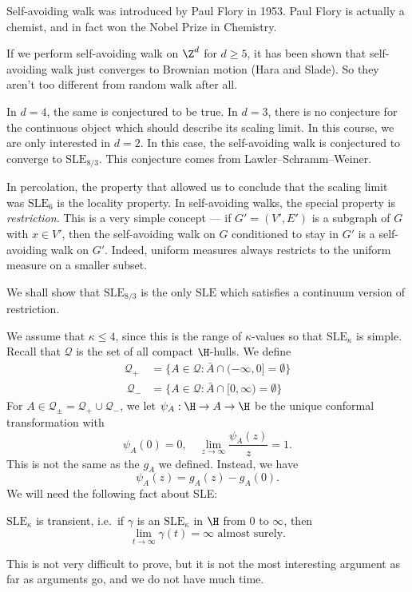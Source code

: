 \documentclass[a4paper]{article}
\newcommand\SLE{\mathrm{SLE}}
\begin{document}
Self-avoiding walk was introduced by Paul Flory in 1953. Paul Flory is actually a chemist, and in fact won the Nobel Prize in Chemistry. %

If we perform self-avoiding walk on $\Z^d$ for $d \geq 5$, it has been shown that self-avoiding walk just converges to Brownian motion (Hara and Slade). So they aren't too different from random walk after all.

In $d = 4$, the same is conjectured to be true. In $d = 3$, there is no conjecture for the continuous object which should describe its scaling limit. In this course, we are only interested in $d = 2$. In this case, the self-avoiding walk is conjectured to converge to $\SLE_{8/3}$. This conjecture comes from Lawler--Schramm--Weiner.

In percolation, the property that allowed us to conclude that the scaling limit was $\SLE_6$ is the locality property. In self-avoiding walks, the special property is \emph{restriction}. This is a very simple concept --- if $G' = (V', E')$ is a subgraph of $G$ with $x \in V'$, then the self-avoiding walk on $G$ conditioned to stay in $G'$ is a self-avoiding walk on $G'$. Indeed, uniform measures always restricts to the uniform measure on a smaller subset.

We shall show that $\SLE_{8/3}$ is the only $\SLE$ which satisfies a continuum version of restriction.

We assume that $\kappa \leq 4$, since this is the range of $\kappa$-values so that $\SLE_\kappa$ is simple. Recall that $\mathcal{Q}$ is the set of all compact $\H$-hulls. We define
\begin{align*}
  \mathcal{Q}_+ &= \{A \in \mathcal{Q} : \bar{A} \cap (-\infty, 0] = \emptyset\}\\\
  \mathcal{Q}_- &= \{A \in \mathcal{Q} : \bar{A} \cap [0, \infty) = \emptyset\}
\end{align*}
For $A \in \mathcal{Q}_{\pm} = \mathcal{Q}_+ \cup \mathcal{Q}_-$, we let $\psi_A: \H \to A \to \H$ be the unique conformal transformation with
\[
  \psi_A(0) = 0,\quad \lim_{z \to \infty} \frac{\psi_A(z)}{z} = 1.
\]
This is not the same as the $g_A$ we defined. Instead, we have
\[
  \psi_A(z) = g_A(z) - g_A(0).
\]
We will need the following fact about SLE:
\begin{fact}
  $\SLE_\kappa$ is transient, i.e.\ if $\gamma$ is an $\SLE_\kappa$ in $\H$ from $0$ to $\infty$, then
  \[
    \lim_{t \to \infty} \gamma(t) = \infty\text{ almost surely}.
  \]
\end{fact}
This is not very difficult to prove, but it is not the most interesting argument as far as arguments go, and we do not have much time.
\end{document}
